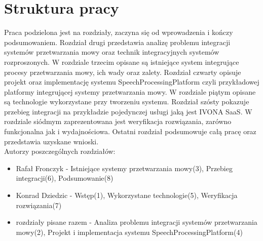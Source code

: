 \section{Struktura pracy}
Praca podzielona jest na rozdziały, zaczyna się od wprowadzenia i kończy podsumowaniem. Rozdział drugi przedstawia analizę problemu integracji systemów przetwarzania mowy oraz technik integracyjnych systemów rozproszonych. W rozdziale trzecim opisane są istniejące system integrujące procesy przetwarzania mowy, ich wady oraz zalety. Rozdział czwarty opisuje projekt oraz implementację systemu SpeechProcessingPlatform czyli przykładowej platformy integrującej systemy przetwarzania mowy. W rozdziale piątym opisane są technologie wykorzystane przy tworzeniu systemu. Rozdział szósty pokazuje przebieg integracji na przykładzie pojedynczej usługi jaką jest IVONA SaaS. W rozdziale siódmym zaprezentowana jest weryfikacja rozwiązania, zarówno funkcjonalna jak i wydajnościowa. Ostatni rozdział podsumowuje całą pracę oraz przedstawia uzyskane wnioski. \\
Autorzy poszczególnych rozdziałów:
\begin{itemize}
	\item Rafał Fronczyk - Istniejące systemy przetwarzania mowy(3), Przebieg integracji(6), Podsumowanie(8)
	\item Konrad Dziedzic - Wstęp(1), Wykorzystane technologie(5), Weryfikacja rozwiązania(7)
	\item rozdziały pisane razem - Analiza problemu integracji systemów przetwarzania mowy(2), Projekt i implementacja systemu SpeechProcessingPlatform(4)
\end{itemize}



